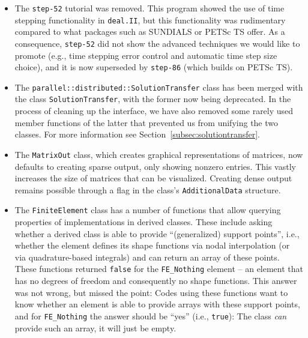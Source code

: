 \documentclass{ansarticle-preprint}
\newcommand{\specialword}[1]{\texttt{#1}}
\newcommand{\dealii}{{\specialword{deal.II}}\xspace}
\newcommand{\step}[1]{{\specialword{step-#1}}\xspace}
\begin{document}
\begin{itemize}
  \item The \step{52} tutorial was removed. This program showed
    the use of time stepping functionality in \dealii{}, but
    this functionality was rudimentary compared to what packages such
    as SUNDIALS or PETSc TS offer. As a consequence, \step{52} did
    not show the advanced techniques we would like to promote (e.g.,
    time stepping error control and automatic time step size choice), and it
    is now superseded by \step{86} (which builds on PETSc TS).
  \item The \texttt{parallel::distributed::SolutionTransfer} class has been
    merged with the class \texttt{SolutionTransfer}, with the
    former now being deprecated. In the process of cleaning up the
    interface, we have also removed some rarely used member functions
    of the latter that prevented us from unifying the two classes. For more
    information see Section~\ref{subsec:solutiontransfer}.
  \item The \texttt{MatrixOut} class, which creates graphical
    representations of matrices, now defaults to creating sparse
    output, only showing nonzero entries. This vastly increases the
    size of matrices that can be visualized. Creating dense output
    remains possible through a flag in the class's
    \texttt{AdditionalData} structure.
  \item The \texttt{FiniteElement} class has a number of functions
    that allow querying properties of implementations in derived
    classes. These include asking whether a derived class is able to provide
    ``(generalized) support points'', i.e., whether the element
    defines its shape functions via nodal interpolation (or via
    quadrature-based integrals) and can return an array of these
    points. These functions returned \texttt{false} for the
    \texttt{FE\_Nothing} element -- an element that has no degrees of
    freedom and consequently no shape functions. This answer was not
    wrong, but missed the point: Codes using these functions want to
    know whether an element is able to provide arrays with these
    support points, and for \texttt{FE\_Nothing} the answer should be
    ``yes'' (i.e., \texttt{true}): The class \textit{can} provide such
    an array, it will just be empty.
\end{itemize}



\end{document}
